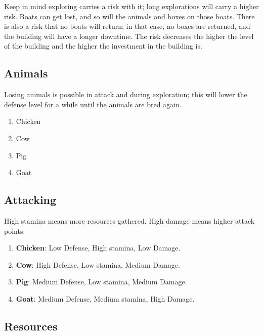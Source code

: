 \documentclass[12pt]{article}
\begin{document}
Keep in mind exploring carries a risk with it; long explorations will carry a higher risk. Boats can get lost, and so will the animals and boxes on those boats. There is also a risk that no boats will return; in that case, no boxes are returned, and the building will have a longer downtime. The risk decreases the higher the level of the building and the higher the investment in the building is.

\subsection{Animals}

Losing animals is possible in attack and during exploration; this will lower the defense level for a while until the animals are bred again.

\begin{enumerate}
    \item Chicken
    \item Cow
    \item Pig
    \item Goat
\end{enumerate}

\subsection{Attacking}

High stamina means more resources gathered. High damage means higher attack points.
\begin{enumerate}
    \item \textbf{Chicken}: Low Defense, High stamina, Low Damage.
    \item \textbf{Cow}: High Defense, Low stamina, Medium Damage.
    \item \textbf{Pig}: Medium Defense, Low stamina, Medium Damage.
    \item \textbf{Goat}: Medium Defense, Medium stamina, High Damage.
\end{enumerate}

\subsection{Resources}
\end{document}

